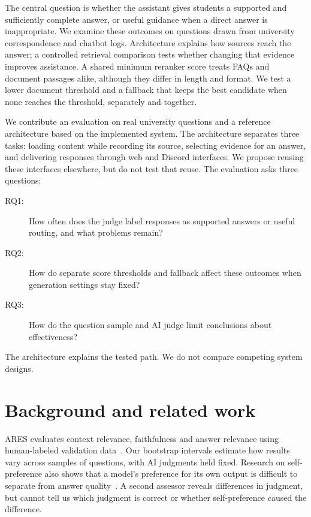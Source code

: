 \documentclass[a4paper,10pt,twocolumn]{article}
\begin{document}
The central question is whether the assistant gives students a supported and sufficiently complete answer, or useful guidance when a direct answer is inappropriate. We examine these outcomes on questions drawn from university correspondence and chatbot logs. Architecture explains how sources reach the answer; a controlled retrieval comparison tests whether changing that evidence improves assistance. A shared minimum reranker score treats FAQs and document passages alike, although they differ in length and format. We test a lower document threshold and a fallback that keeps the best candidate when none reaches the threshold, separately and together.

We contribute an evaluation on real university questions and a reference architecture based on the implemented system. The architecture separates three tasks: loading content while recording its source, selecting evidence for an answer, and delivering responses through web and Discord interfaces. We propose reusing these interfaces elsewhere, but do not test that reuse. The evaluation asks three questions:
\begin{description}
\item[RQ1:] How often does the judge label responses as supported answers or useful routing, and what problems remain?
\item[RQ2:] How do separate score thresholds and fallback affect these outcomes when generation settings stay fixed?
\item[RQ3:] How do the question sample and AI judge limit conclusions about effectiveness?
\end{description}
The architecture explains the tested path. We do not compare competing system designs.

\section{Background and related work}


ARES evaluates context relevance, faithfulness and answer relevance using human-labeled validation data~\cite{saadfalcon2024ares}. Our bootstrap intervals estimate how results vary across samples of questions, with AI judgments held fixed. Research on self-preference also shows that a model's preference for its own output is difficult to separate from answer quality~\cite{chen2025selfpreference}. A second assessor reveals differences in judgment, but cannot tell us which judgment is correct or whether self-preference caused the difference.
\end{document}
